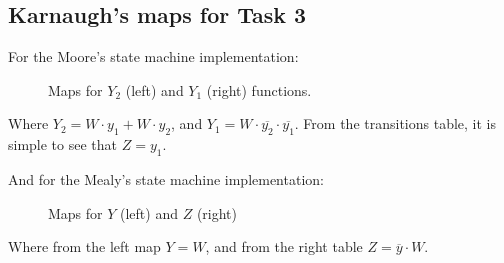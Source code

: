 \newpage
\subsection*{Karnaugh's maps for Task 3}
For the Moore's state machine implementation:


\begin{figure}[H]
    \begin{center}
         \begin{KarnaughvuitV3}
         \end{KarnaughvuitV3}
         \begin{KarnaughvuitV3}
         \end{KarnaughvuitV3}
         \caption{Maps for $Y_2$ (left) and $Y_1$ (right) functions.}
    \end{center}
    \end{figure}
Where $Y_2 = W \cdot y_1 + W \cdot y_2$, and $Y_1 = W \cdot \overline{y_2} \cdot \overline{y_1}$. 
From the transitions table, it is simple to see that $Z = y_1$.

And for the Mealy's state machine implementation:

\begin{figure}[H]
    \begin{center}
     \begin{KarnaughquatreV3}
     \end{KarnaughquatreV3}
     \begin{KarnaughquatreV3}
    \end{KarnaughquatreV3}
     \caption{Maps for $Y$ (left) and $Z$ (right)}
    \end{center}
\end{figure}
Where from the left map $Y = W$, and from the right
table $Z = \overline{y} \cdot W$.


